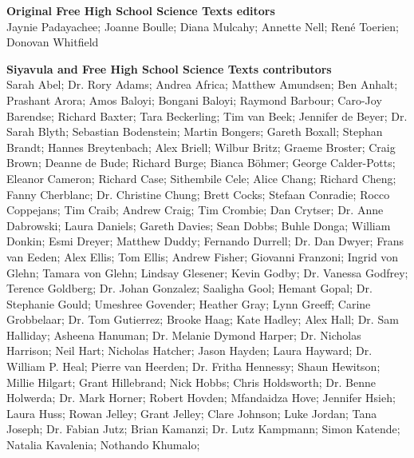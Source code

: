 \textbf{\large Original Free High School Science Texts editors}\\

Jaynie Padayachee; Joanne Boulle; Diana Mulcahy; Annette Nell; René Toerien; Donovan Whitfield \par

\textbf{\large Siyavula and Free High School Science Texts contributors}\\

\thispagestyle{empty}
    Sarah Abel;
Dr. Rory Adams;
    Andrea Africa;
    Matthew Amundsen;
    Ben Anhalt;
    Prashant Arora;
    Amos Baloyi;
    Bongani Baloyi;
    Raymond Barbour;
    Caro-Joy Barendse;
    Richard Baxter;
    Tara Beckerling;
    Tim van Beek;
    Jennifer de Beyer;
Dr. Sarah Blyth;
    Sebastian Bodenstein;
    Martin Bongers;
    Gareth Boxall;
    Stephan Brandt;
    Hannes Breytenbach;
    Alex Briell;
    Wilbur Britz;
    Graeme Broster;
    Craig Brown;
    Deanne de Bude;
    Richard Burge;
    Bianca Böhmer;
    George Calder-Potts;
    Eleanor Cameron;
    Richard Case;
    Sithembile Cele;
    Alice Chang;
    Richard Cheng;
    Fanny Cherblanc;
Dr. Christine Chung;
    Brett Cocks;
    Stefaan Conradie;
    Rocco Coppejans;
    Tim Craib;
    Andrew Craig;
    Tim Crombie;
    Dan Crytser;
Dr. Anne Dabrowski;
    Laura Daniels;
    Gareth Davies;
    Sean Dobbs;
    Buhle Donga;
    William Donkin;
    Esmi Dreyer;
    Matthew Duddy;
    Fernando Durrell;
Dr. Dan Dwyer;
    Frans van Eeden;
    Alex Ellis;
    Tom Ellis;
    Andrew Fisher;
    Giovanni Franzoni;
    Ingrid von Glehn;
    Tamara von Glehn;
    Lindsay Glesener;
    Kevin Godby;
Dr. Vanessa Godfrey;
    Terence Goldberg;
Dr. Johan Gonzalez;
    Saaligha Gool;
    Hemant Gopal;
Dr. Stephanie Gould;
    Umeshree Govender;
    Heather Gray;
    Lynn Greeff;
    Carine Grobbelaar;
Dr. Tom Gutierrez;
    Brooke Haag;
    Kate Hadley;
    Alex Hall;
Dr. Sam Halliday;
    Asheena Hanuman;
Dr. Melanie Dymond Harper;
Dr. Nicholas Harrison;
    Neil Hart;
    Nicholas Hatcher;
    Jason Hayden;
    Laura Hayward;
Dr. William P. Heal;
    Pierre van Heerden;
Dr. Fritha Hennessy;
    Shaun Hewitson;
    Millie Hilgart;
    Grant Hillebrand;
    Nick Hobbs;
    Chris Holdsworth;
Dr. Benne Holwerda;
Dr. Mark Horner;
    Robert Hovden;
    Mfandaidza Hove;
    Jennifer Hsieh;
    Laura Huss;
    Rowan Jelley;
    Grant Jelley;
    Clare Johnson;
    Luke Jordan;
    Tana Joseph;
Dr. Fabian Jutz;
    Brian Kamanzi;
Dr. Lutz Kampmann;
    Simon Katende;
    Natalia Kavalenia;
    Nothando Khumalo;
